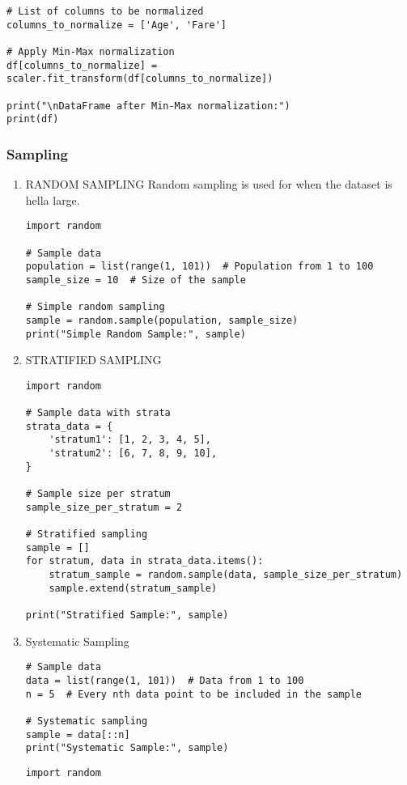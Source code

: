 \documentclass[11pt]{article}
\begin{document}
\begin{enumerate}
\begin{enumerate}
\begin{verbatim}
# List of columns to be normalized
columns_to_normalize = ['Age', 'Fare']

# Apply Min-Max normalization
df[columns_to_normalize] = scaler.fit_transform(df[columns_to_normalize])

print("\nDataFrame after Min-Max normalization:")
print(df)
\end{verbatim}
\end{enumerate}
\end{enumerate}
\subsubsection{Sampling}
\label{sec:org1899a6a}
\begin{enumerate}
\item RANDOM SAMPLING
\label{sec:org59a9499}
Random sampling is used for when the dataset is hella large.
\begin{verbatim}
import random

# Sample data
population = list(range(1, 101))  # Population from 1 to 100
sample_size = 10  # Size of the sample

# Simple random sampling
sample = random.sample(population, sample_size)
print("Simple Random Sample:", sample)
\end{verbatim}
\item STRATIFIED SAMPLING
\label{sec:orgf3784cd}
\begin{verbatim}
import random

# Sample data with strata
strata_data = {
    'stratum1': [1, 2, 3, 4, 5],
    'stratum2': [6, 7, 8, 9, 10],
}

# Sample size per stratum
sample_size_per_stratum = 2

# Stratified sampling
sample = []
for stratum, data in strata_data.items():
    stratum_sample = random.sample(data, sample_size_per_stratum)
    sample.extend(stratum_sample)

print("Stratified Sample:", sample)
\end{verbatim}
\item Systematic Sampling
\label{sec:orgba43c8f}
\begin{verbatim}
# Sample data
data = list(range(1, 101))  # Data from 1 to 100
n = 5  # Every nth data point to be included in the sample

# Systematic sampling
sample = data[::n]
print("Systematic Sample:", sample)
\end{verbatim}


\begin{verbatim}
import random


\end{verbatim}
\end{enumerate}
\end{document}
